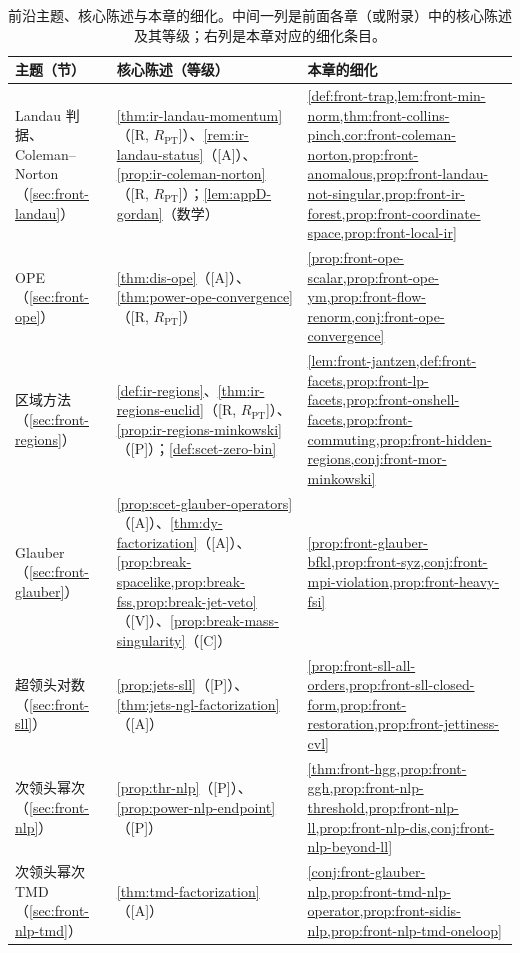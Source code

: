 \begin{table}[htbp]
\centering
\caption{前沿主题、核心陈述与本章的细化。中间一列是前面各章（或附录）中的核心陈述及其等级；右列是本章对应的细化条目。}\label{tab:front-map}
\small
\renewcommand{\arraystretch}{1.12}
\begin{tabularx}{\textwidth}{@{}p{2.5cm}>{\raggedright\arraybackslash}X>{\raggedright\arraybackslash}X@{}}
\toprule
主题（节） & 核心陈述（等级） & 本章的细化 \\
\midrule
Landau 判据、Coleman--Norton（\cref{sec:front-landau}） & \cref{thm:ir-landau-momentum}（[R, $R_{\mathrm{PT}}$]）、\cref{rem:ir-landau-status}（[A]）、\cref{prop:ir-coleman-norton}（[R, $R_{\mathrm{PT}}$]）；\cref{lem:appD-gordan}（数学） & \cref{def:front-trap,lem:front-min-norm,thm:front-collins-pinch,cor:front-coleman-norton,prop:front-anomalous,prop:front-landau-not-singular,prop:front-ir-forest,prop:front-coordinate-space,prop:front-local-ir} \\
OPE（\cref{sec:front-ope}） & \cref{thm:dis-ope}（[A]）、\cref{thm:power-ope-convergence}（[R, $R_{\mathrm{PT}}$]） & \cref{prop:front-ope-scalar,prop:front-ope-ym,prop:front-flow-renorm,conj:front-ope-convergence} \\
区域方法（\cref{sec:front-regions}） & \cref{def:ir-regions}、\cref{thm:ir-regions-euclid}（[R, $R_{\mathrm{PT}}$]）、\cref{prop:ir-regions-minkowski}（[P]）；\cref{def:scet-zero-bin} & \cref{lem:front-jantzen,def:front-facets,prop:front-lp-facets,prop:front-onshell-facets,prop:front-commuting,prop:front-hidden-regions,conj:front-mor-minkowski} \\
Glauber（\cref{sec:front-glauber}） & \cref{prop:scet-glauber-operators}（[A]）、\cref{thm:dy-factorization}（[A]）、\cref{prop:break-spacelike,prop:break-fss,prop:break-jet-veto}（[V]）、\cref{prop:break-mass-singularity}（[C]） & \cref{prop:front-glauber-bfkl,prop:front-syz,conj:front-mpi-violation,prop:front-heavy-fsi} \\
超领头对数（\cref{sec:front-sll}） & \cref{prop:jets-sll}（[P]）、\cref{thm:jets-ngl-factorization}（[A]） & \cref{prop:front-sll-all-orders,prop:front-sll-closed-form,prop:front-restoration,prop:front-jettiness-cvl} \\
次领头幂次（\cref{sec:front-nlp}） & \cref{prop:thr-nlp}（[P]）、\cref{prop:power-nlp-endpoint}（[P]） & \cref{thm:front-hgg,prop:front-ggh,prop:front-nlp-threshold,prop:front-nlp-ll,prop:front-nlp-dis,conj:front-nlp-beyond-ll} \\
次领头幂次 TMD（\cref{sec:front-nlp-tmd}） & \cref{thm:tmd-factorization}（[A]） & \cref{conj:front-glauber-nlp,prop:front-tmd-nlp-operator,prop:front-sidis-nlp,prop:front-nlp-tmd-oneloop} \\

\end{tabularx}
\end{table}
